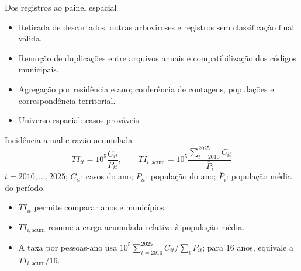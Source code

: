 \documentclass[aspectratio=169,11pt]{beamer}
\begin{document}
\begin{frame}{Dos registros ao painel espacial}
\begin{itemize}
\item Retirada de descartados, outras arboviroses e registros sem classificação final válida.
\item Remoção de duplicações entre arquivos anuais e compatibilização dos códigos municipais.
\item Agregação por residência e ano; conferência de contagens, populações e correspondência territorial.
\item Universo espacial: \ScanTotalCasos{} casos prováveis.
\end{itemize}
\end{frame}

\begin{frame}{Incidência anual e razão acumulada}
\[
TI_{it}=10^5\frac{C_{it}}{P_{it}},\qquad
TI_{i,\mathrm{acum}}=10^5\frac{\sum_{t=2010}^{2025} C_{it}}{\overline P_i}
\]
$t=2010,\ldots,2025$; $C_{it}$: casos do ano; $P_{it}$: população do ano; $\overline P_i$: população média do período.
\medskip\begin{itemize}
\item $TI_{it}$ permite comparar anos e municípios.
\item $TI_{i,\mathrm{acum}}$ resume a carga acumulada relativa à população média.
\item A taxa por pessoas-ano usa $10^5\sum_{t=2010}^{2025} C_{it}/\sum_t P_{it}$; para 16 anos, equivale a $TI_{i,\mathrm{acum}}/16$.
\end{itemize}
\end{frame}
\end{document}
